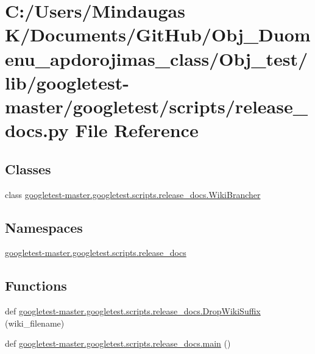 \hypertarget{_obj__test_2lib_2googletest-master_2googletest_2scripts_2release__docs_8py}{}\section{C\+:/\+Users/\+Mindaugas K/\+Documents/\+Git\+Hub/\+Obj\+\_\+\+Duomenu\+\_\+apdorojimas\+\_\+class/\+Obj\+\_\+test/lib/googletest-\/master/googletest/scripts/release\+\_\+docs.py File Reference}
\label{_obj__test_2lib_2googletest-master_2googletest_2scripts_2release__docs_8py}
\subsection*{Classes}
\begin{DoxyCompactItemize}
\item 
class \mbox{\hyperlink{classgoogletest-master_1_1googletest_1_1scripts_1_1release__docs_1_1_wiki_brancher}{googletest-\/master.\+googletest.\+scripts.\+release\+\_\+docs.\+Wiki\+Brancher}}
\end{DoxyCompactItemize}
\subsection*{Namespaces}
\begin{DoxyCompactItemize}
\item 
 \mbox{\hyperlink{namespacegoogletest-master_1_1googletest_1_1scripts_1_1release__docs}{googletest-\/master.\+googletest.\+scripts.\+release\+\_\+docs}}
\end{DoxyCompactItemize}
\subsection*{Functions}
\begin{DoxyCompactItemize}
\item 
def \mbox{\hyperlink{namespacegoogletest-master_1_1googletest_1_1scripts_1_1release__docs_a908212f861885cf62b68332b09cf9f58}{googletest-\/master.\+googletest.\+scripts.\+release\+\_\+docs.\+Drop\+Wiki\+Suffix}} (wiki\+\_\+filename)
\item 
def \mbox{\hyperlink{namespacegoogletest-master_1_1googletest_1_1scripts_1_1release__docs_a6907eb183423ba23daba08bd4cf71d42}{googletest-\/master.\+googletest.\+scripts.\+release\+\_\+docs.\+main}} ()
\end{DoxyCompactItemize}
